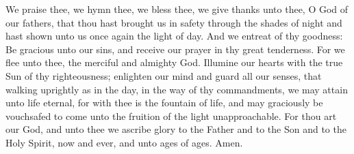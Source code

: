  We praise thee, we hymn thee, we bless thee, we give thanks unto thee, O God of our fathers, that thou hast brought us in safety through the shades of night and hast shown unto us once again the light of day. And we entreat of thy goodness: Be gracious unto our sins, and receive our prayer in thy great tenderness. For we flee unto thee, the merciful and almighty God. Illumine our hearts with the true Sun of thy righteousness; enlighten our mind and guard all our senses, that walking uprightly as in the day, in the way of thy commandments, we may attain unto life eternal, for with thee is the fountain of life, and may graciously be vouchsafed to come unto the fruition of the light unapproachable. For thou art our God, and unto thee we ascribe glory to the Father and to the Son and to the Holy Spirit, now and ever, and unto ages of ages. Amen.
